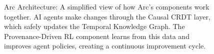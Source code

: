 \begin{figure}[H]
{\begin{tikzpicture}
  \end{tikzpicture}
  }
  \caption{Arc Architecture: A simplified view of how Arc's components work together. AI agents make changes through the Causal CRDT layer, which safely updates the Temporal Knowledge Graph. The Provenance-Driven RL component learns from this data and improves agent policies, creating a continuous improvement cycle.}
  \label{fig:arc_architecture}
\end{figure}
